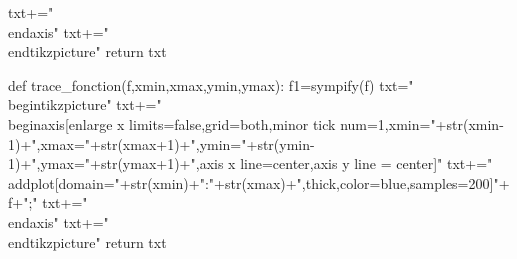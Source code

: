 \begin{pycode}
    txt+="\\end{axis}"
    txt+="\\end{tikzpicture}"
    return txt
    
def trace_fonction(f,xmin,xmax,ymin,ymax):
    f1=sympify(f)
    txt="\\begin{tikzpicture}"
    txt+="\\begin{axis}[enlarge x limits=false,grid=both,minor tick num=1,xmin="+str(xmin-1)+",xmax="+str(xmax+1)+",ymin="+str(ymin-1)+",ymax="+str(ymax+1)+",axis x line=center,axis y line = center]"
    txt+="\\addplot[domain="+str(xmin)+":"+str(xmax)+",thick,color=blue,samples=200]{"+f+"};"
    txt+="\\end{axis}"
    txt+="\\end{tikzpicture}"
    return txt

\end{pycode}